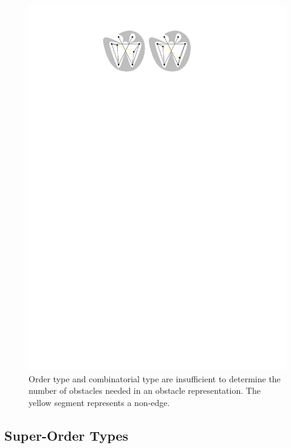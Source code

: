 \documentclass{patmorin}
\begin{document}
\begin{figure}
  \begin{center}
    \includegraphics{order-type}
  \end{center}
  \caption{Order type and combinatorial type are insufficient to determine 
      the number of obstacles needed in an obstacle representation. The yellow
      segment represents a non-edge.}
\end{figure}

\subsection{Super-Order Types}
\end{document}
